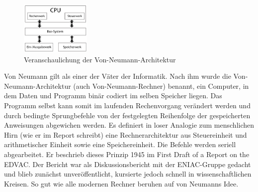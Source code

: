 \begin{figure}[ht]
\includegraphics[width=0.3\textwidth]{vna.png}
\caption{Veranschaulichung der Von-Neumann-Architektur}
\end{figure}
Von Neumann gilt als einer der Väter der Informatik. Nach ihm wurde die Von-Neumann-Architektur (auch Von-Neumann-Rechner) benannt, ein Computer, in dem Daten und Programm binär codiert im selben Speicher liegen. Das Programm selbst kann somit im laufenden Rechenvorgang verändert werden und durch bedingte Sprungbefehle von der festgelegten Reihenfolge der gespeicherten Anweisungen abgewichen werden. Es definiert in loser Analogie zum menschlichen Hirn (wie er im Report schreibt) eine Rechnerarchitektur aus Steuereinheit und arithmetischer Einheit sowie eine Speichereinheit. Die Befehle werden seriell abgearbeitet. Er beschrieb dieses Prinzip 1945 im First Draft of a Report on the EDVAC. Der Bericht war als Diskussionsbericht mit der ENIAC-Gruppe gedacht und blieb zunächst unveröffentlicht, kursierte jedoch schnell in wissenschaftlichen Kreisen. So gut wie alle modernen Rechner beruhen auf von Neumanns Idee.

